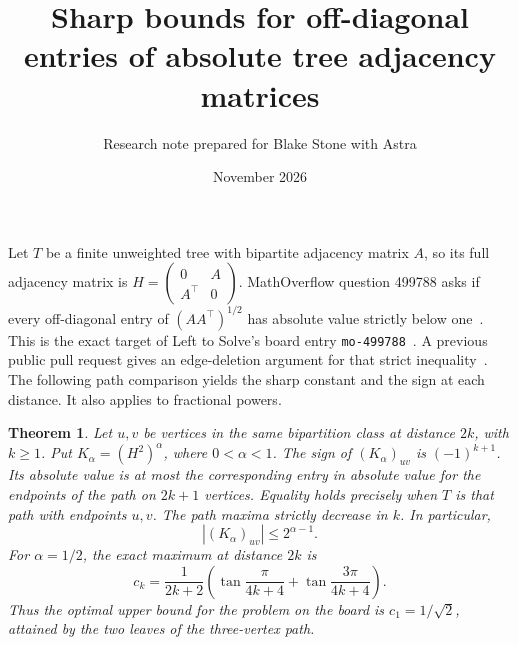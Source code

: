 \documentclass[11pt]{article}
\title{Sharp bounds for off-diagonal entries of absolute tree adjacency matrices}
\author{Research note prepared for Blake Stone with Astra}
\date{November 2026}
\newtheorem{theorem}{Theorem}
\begin{document}
\maketitle
Let $T$ be a finite unweighted tree with bipartite adjacency matrix $A$, so its full adjacency matrix is $H=\left(\begin{smallmatrix}0&A\\ A^\top&0\end{smallmatrix}\right)$. MathOverflow question 499788 asks if every off-diagonal entry of $(AA^\top)^{1/2}$ has absolute value strictly below one~\cite{mo}. This is the exact target of Left to Solve's board entry \texttt{mo-499788}~\cite{board}. A previous public pull request gives an edge-deletion argument for that strict inequality~\cite{prior}. The following path comparison yields the sharp constant and the sign at each distance. It also applies to fractional powers.
\begin{theorem}
Let $u,v$ be vertices in the same bipartition class at distance $2k$, with $k\ge1$. Put $K_\alpha=(H^2)^\alpha$, where $0<\alpha<1$. The sign of $(K_\alpha)_{uv}$ is $(-1)^{k+1}$. Its absolute value is at most the corresponding entry in absolute value for the endpoints of the path on $2k+1$ vertices. Equality holds precisely when $T$ is that path with endpoints $u,v$. The path maxima strictly decrease in $k$. In particular,
\[
     |(K_\alpha)_{uv}|\le 2^{\alpha-1}.
\]
For $\alpha=1/2$, the exact maximum at distance $2k$ is
\[
 c_k=\frac{1}{2k+2}\left(
 \tan\frac{\pi}{4k+4}+\tan\frac{3\pi}{4k+4}\right).
\]
Thus the optimal upper bound for the problem on the board is $c_1=1/\sqrt2$, attained by the two leaves of the three-vertex path.
\end{theorem}
\end{document}
